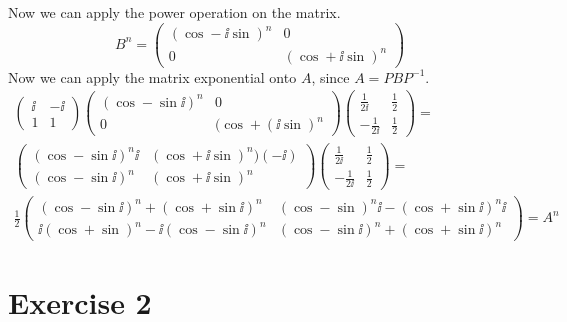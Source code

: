 Now we can apply the power operation on the matrix.
\begin{equation*}
B^n = \left( \begin{array}{cc}
(\cos - \ii \sin)^n & 0\\
 0 & (\cos + \ii \sin )^n
\end{array}
\right)
\end{equation*}
Now we can apply the matrix exponential onto $A$, since $A = PBP^{-1}$.
\begin{eqnarray*}
\left( \begin{array}{cc}
\ii & - \ii \\
1 & 1
\end{array}
\right)
\left( \begin{array}{cc}
(\cos - \sin \ii)^n & 0 \\
0 & (\cos + (\ii \sin )^n
\end{array}
\right)
\left( \begin{array}{cc}
\frac{1}{2\ii} & \frac{1}{2} \\
-\frac{1}{2 \ii} & \frac{1}{2}
\end{array}
\right)
=\\
\left( \begin{array}{cc}
(\cos - \sin \ii)^n \ii & (\cos + \ii \sin)^n)(-\ii) \\
(\cos - \sin \ii)^n & (\cos + \ii \sin)^n 
\end{array}
\right)
\left( \begin{array}{cc}
\frac{1}{2\ii} & \frac{1}{2} \\
-\frac{1}{2 \ii} & \frac{1}{2}
\end{array}
\right)
=\\
\frac{1}{2}
\left( \begin{array}{cc}
\left( \cos - \sin \ii \right)^n + (\cos + \sin \ii )^n & (\cos - \sin)^n \ii - (\cos + \sin \ii)^n \ii \\ 
\ii (\cos + \sin)^n  - \ii (\cos - \sin \ii )^n & \left( \cos - \sin \ii \right)^n + (\cos + \sin \ii )^n 
\end{array}
\right)
=
A^n
\end{eqnarray*}

\section{Exercise 2}